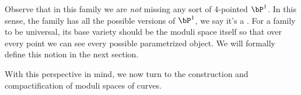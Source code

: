 Observe that in this family we are \emph{not} missing any sort of 4-pointed $\bP^1$. In this sense, the family has all the possible versions of $\bP^1$, we say it's a . For a family to be universal, its base variety should be the moduli space itself so that over every point we can see every possible parametrized object. We will formally define this notion in the next section.\par
With this perspective in mind, we now turn to the construction and compactification of moduli spaces of curves.